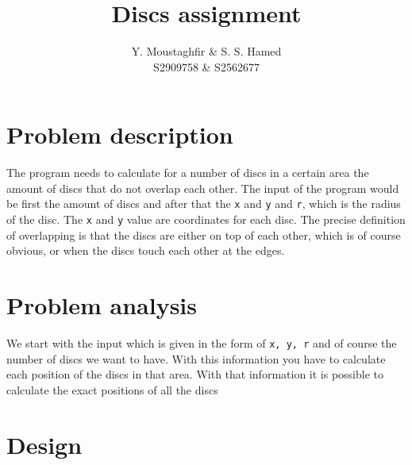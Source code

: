 \documentclass[a4paper,10pt]{article}
\title{Discs assignment}
\author{Y. Moustaghfir \& S. S. Hamed\\
        S2909758 \& S2562677}
\begin{document}
\maketitle

\section{Problem description}
The program needs to calculate for a number of discs in a certain area the amount of discs that do not overlap each other. The input of the program would be first the amount of discs and after that the {\tt x} and {\tt y} and {\tt r}, which is the radius of the disc. The {\tt x} and {\tt y} value are coordinates for each disc. The precise definition of overlapping is that the discs are either on top of each other, which is of course obvious, or when the discs touch each other at the edges. 

\section{Problem analysis}
We start with the input which is given in the form of {\tt x, y, r} and of course the number of discs we want to have. With this information you have to calculate each position of the discs in that area. With that information it is possible to calculate the exact positions of all the discs

\section{Design}
\end{document}

